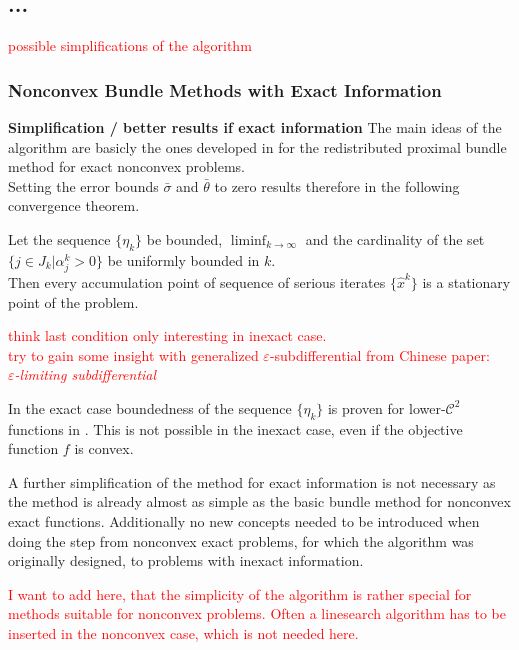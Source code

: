 \subsection{...}
\textcolor{red}{possible simplifications of the algorithm} \\

\subsubsection{Nonconvex Bundle Methods with Exact Information}

\textbf{Simplification / better results if exact information}
The main ideas of the algorithm are basicly the ones developed in \cite{Hare2010} for the redistributed proximal bundle method for exact nonconvex problems. \\
Setting the error bounds \(\bar{\sigma}\) and \(\bar{\theta}\) to zero results therefore in the following convergence theorem. 

\begin{theorem}
	Let the sequence \(\{\eta_k\}\) be bounded, \(\liminf_{k \to \infty }\) and the cardinality of the set \(\{j \in J_k | \alpha_j^k > 0\}\) be uniformly bounded in \(k\). \\
	Then every accumulation point of sequence of serious iterates \(\{\hat{x}^k\}\) is a stationary point of the problem.
\end{theorem}

\textcolor{red}{think last condition only interesting in inexact case. \\
try to gain some insight with generalized \(\varepsilon\)-subdifferential from Chinese paper:\\
\(\varepsilon\)\emph{-limiting subdifferential} \cite{}}

In the exact case boundedness of the sequence \(\{\eta_k\}\) is proven for lower-\(\mathcal{C}^2\) functions in \cite{Hare2010}. This is not possible in the inexact case, even if the objective function \(f\) is convex.

A further simplification of the method for exact information is not necessary as the method is already almost as simple as the basic bundle method for nonconvex exact functions. Additionally no new concepts needed to be introduced when doing the step from nonconvex exact problems, for which the algorithm was originally designed, to problems with inexact information.

\textcolor{red}{\begin{remark}
	I want to add here, that the simplicity of the algorithm is rather special for methods suitable for nonconvex problems. Often a linesearch algorithm has to be inserted in the nonconvex case, which is not needed here. 
\end{remark}}

